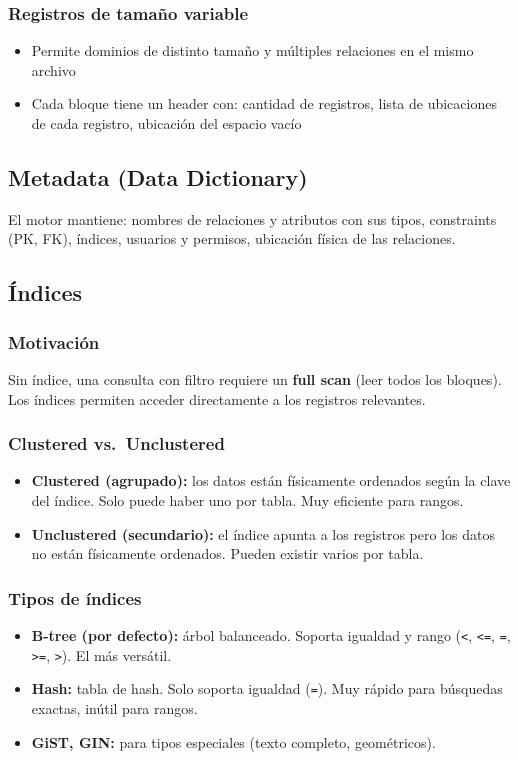 \documentclass[12pt, a4paper]{article}
\begin{document}
\subsubsection{Registros de tamaño variable}
\begin{itemize}
  \item Permite dominios de distinto tamaño y múltiples relaciones en el mismo archivo
  \item Cada bloque tiene un header con: cantidad de registros, lista de ubicaciones de cada registro, ubicación del espacio vacío
\end{itemize}

\subsection{Metadata (Data Dictionary)}
El motor mantiene: nombres de relaciones y atributos con sus tipos, constraints (PK, FK), índices, usuarios y permisos, ubicación física de las relaciones.

\subsection{Índices}

\subsubsection{Motivación}
Sin índice, una consulta con filtro requiere un \textbf{full scan} (leer todos los bloques). Los índices permiten acceder directamente a los registros relevantes.

\subsubsection{Clustered vs.\ Unclustered}
\begin{itemize}
  \item \textbf{Clustered (agrupado):} los datos están físicamente ordenados según la clave del índice. Solo puede haber uno por tabla. Muy eficiente para rangos.
  \item \textbf{Unclustered (secundario):} el índice apunta a los registros pero los datos no están físicamente ordenados. Pueden existir varios por tabla.
\end{itemize}

\subsubsection{Tipos de índices}
\begin{itemize}
  \item \textbf{B-tree (por defecto):} árbol balanceado. Soporta igualdad y rango (\texttt{<}, \texttt{<=}, \texttt{=}, \texttt{>=}, \texttt{>}). El más versátil.
  \item \textbf{Hash:} tabla de hash. Solo soporta igualdad (\texttt{=}). Muy rápido para búsquedas exactas, inútil para rangos.
  \item \textbf{GiST, GIN:} para tipos especiales (texto completo, geométricos).
\end{itemize}
\end{document}
